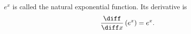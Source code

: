 \begin{frame}
\begin{definition}
$e^x$ is called the natural exponential function.  Its derivative is
\[
\frac{\diff}{\diff x} \left(e^x\right) = e^x .
\]
\end{definition}
\end{frame}
